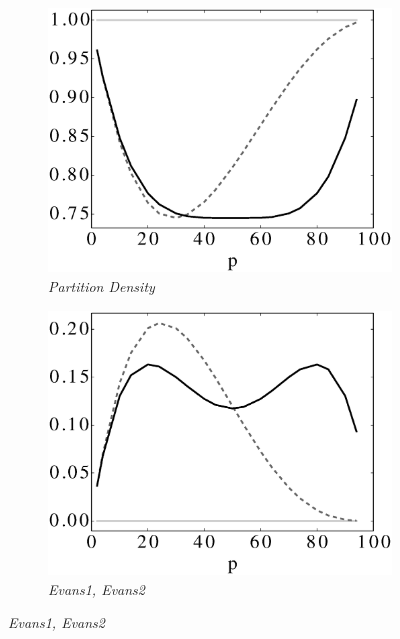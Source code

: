 \begin{figure}[h]
\centering
	\begin{subfigure}{0.35\linewidth}
		\includegraphics[width=\linewidth]{img/ExpectedNodes/1Clique/Clique_Partitiondensity.eps}
		\caption{\label{fig:1CAhn}\emph{Partition Density}}		
	\end{subfigure}\hspace*{1cm}
	\begin{subfigure}{0.35\linewidth}
		\includegraphics[width=\linewidth]{img/ExpectedNodes/1Clique/Clique_Evans1.eps}
		\caption{\label{fig:1CE2}\emph{Evans1, Evans2}}		
	\end{subfigure}


\end{figure}
